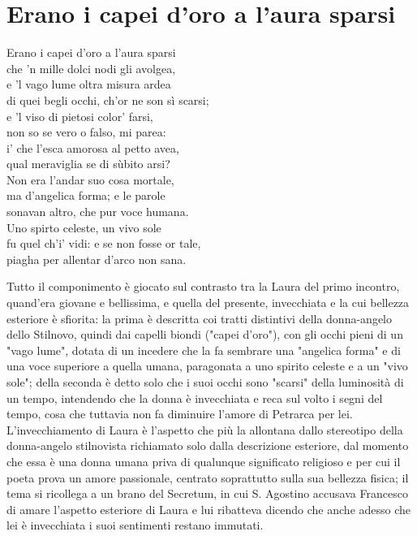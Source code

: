 \documentclass[10pt,a4paper]{article}
\begin{document}
\section{Erano i capei d'oro a l'aura sparsi}

\begin{estratto}
	Erano i capei d’oro a l’aura sparsi\\
	che ’n mille dolci nodi gli avolgea,\\
	e ’l vago lume oltra misura ardea\\
	di quei begli occhi, ch’or ne son sì scarsi;\\
	
	e ’l viso di pietosi color’ farsi,\\
	non so se vero o falso, mi parea:\\
	i’ che l’esca amorosa al petto avea,\\
	qual meraviglia se di sùbito arsi?\\
	
	Non era l’andar suo cosa mortale,\\
	ma d’angelica forma; e le parole\\
	sonavan altro, che pur voce humana.\\
	
	Uno spirto celeste, un vivo sole\\
	fu quel ch’i' vidi: e se non fosse or tale,\\
	piagha per allentar d’arco non sana.\\
\end{estratto}

Tutto il componimento è giocato sul contrasto tra la Laura del primo incontro, quand'era giovane e bellissima, e quella del presente, invecchiata e la cui bellezza esteriore è sfiorita: la prima è descritta coi tratti distintivi della donna-angelo dello Stilnovo, quindi dai capelli biondi ("capei d'oro"), con gli occhi pieni di un "vago lume", dotata di un incedere che la fa sembrare una "angelica forma" e di una voce superiore a quella umana, paragonata a uno spirito celeste e a un "vivo sole"; della seconda è detto solo che i suoi occhi sono "scarsi" della luminosità di un tempo, intendendo che la donna è invecchiata e reca sul volto i segni del tempo, cosa che tuttavia non fa diminuire l'amore di Petrarca per lei. L'invecchiamento di Laura è l'aspetto che più la allontana dallo stereotipo della donna-angelo stilnovista richiamato solo dalla descrizione esteriore, dal momento che essa è una donna umana priva di qualunque significato religioso e per cui il poeta prova un amore passionale, centrato soprattutto sulla sua bellezza fisica; il tema si ricollega a un brano del Secretum, in cui S. Agostino accusava Francesco di amare l'aspetto esteriore di Laura e lui ribatteva dicendo che anche adesso che lei è invecchiata i suoi sentimenti restano immutati.\\
\end{document}

